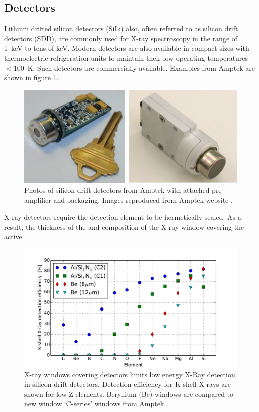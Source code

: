 \documentclass[12pt,letterpaper,final]{article}
\begin{document}
\subsection{Detectors}
\label{sec:detectors}
Lithium drifted silicon detectors (SiLi) also, often referred to as silicon drift detectors (SDD), are commonly used for X-ray spectroscopy in the range of 1~keV to tens of keV. Modern detectors are also available in compact sizes with thermoelectric refrigeration units to maintain their low operating temperatures $< 100$~K. Such detectors are commercially available. Examples from Amptek \cite{Amptek} are shown in figure \ref{fig:AmptekDetectors}.

\begin{figure}[!h]
 \centering
  \includegraphics[width=\columnwidth]{figures/SDDPhoto_DoubleCol.pdf}
 \caption{Photos of silicon drift detectors from Amptek with attached pre-amplifier and packaging. Images reproduced from Amptek website \cite{Amptek}.}
 \label{fig:AmptekDetectors}
\end{figure}

X-ray detectors require the detection element to be hermetically sealed. As a result, the thickness of the and composition of the X-ray window covering the active 

\begin{figure}[!h]
 \centering
  \includegraphics[width=\columnwidth]{figures/KShellDetectorEfficiency.pdf}
 \caption{X-ray windows covering detectors limits low energy X-Ray detection in silicon drift detectors. Detection efficiency for K-shell X-rays are shown for low-Z elements. Beryllium (Be) windows are compared to new window `C-series' windows from Amptek \cite{Amptek}. }
 \label{fig:DetectorEff}
\end{figure}
\end{document}
